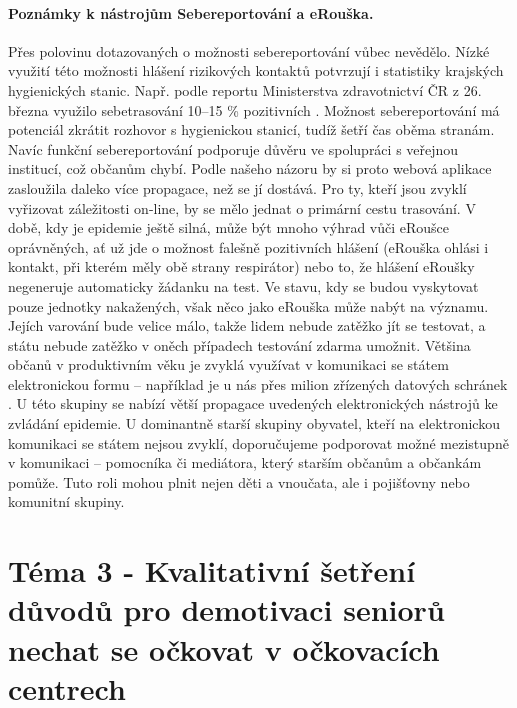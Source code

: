 \paragraph*{Poznámky k nástrojům Sebereportování a eRouška.}
Přes polovinu dotazovaných o možnosti sebereportování vůbec nevědělo. Nízké využití této možnosti hlášení rizikových kontaktů potvrzují i statistiky krajských hygienických stanic. Např. podle reportu Ministerstva zdravotnictví ČR z 26. března využilo sebetrasování 10–15 \% pozitivních \cite{MinisterstvoZdravotnictviCR2021}. Možnost sebereportování má potenciál zkrátit rozhovor s hygienickou stanicí, tudíž šetří čas oběma stranám. Navíc funkční sebereportování podporuje důvěru ve spolupráci s veřejnou institucí, což občanům chybí. Podle našeho názoru by si proto webová aplikace zasloužila daleko více propagace, než se jí dostává. Pro ty, kteří jsou zvyklí vyřizovat záležitosti on-line, by se mělo jednat o primární cestu trasování. 
V době, kdy je epidemie ještě silná, může být mnoho výhrad vůči eRoušce oprávněných, ať už jde o možnost falešně pozitivních hlášení (eRouška ohlási i kontakt, při kterém měly obě strany respirátor) nebo to, že hlášení eRoušky negeneruje automaticky žádanku na test. Ve stavu, kdy se budou vyskytovat pouze jednotky nakažených, však něco jako eRouška může nabýt na významu. Jejích varování bude velice málo, takže lidem nebude zatěžko jít se testovat, a státu nebude zatěžko v oněch případech testování zdarma umožnit. 
Většina občanů v produktivním věku je zvyklá využívat v komunikaci se státem elektronickou formu – například je u nás přes milion zřízených datových schránek \cite{DatoveSchranky2021}. U této skupiny se nabízí větší propagace uvedených elektronických nástrojů ke zvládání epidemie. U dominantně starší skupiny obyvatel, kteří na elektronickou komunikaci se státem nejsou zvyklí, doporučujeme podporovat možné mezistupně v komunikaci – pomocníka či mediátora, který starším občanům a občankám pomůže. Tuto roli mohou plnit nejen děti a vnoučata, ale i pojišťovny nebo komunitní skupiny. 

\section*{Téma 3 - Kvalitativní šetření důvodů pro demotivaci seniorů nechat se očkovat v očkovacích centrech}

